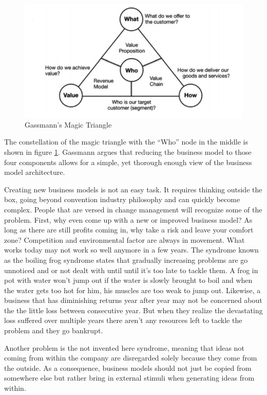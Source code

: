 		\begin{figure}[ht]
		    \begin{center}
		    \includegraphics[scale=0.6]{Talk11/Figure1.png}
		    \end{center}
		    \caption{Gassmann's Magic Triangle}
		    \label{fig:m_triangle}
		\end{figure}
		The constellation of the magic triangle with the ``Who'' node in the middle is shown in figure \ref{fig:m_triangle}.
		Gassmann argues that reducing the business model to those four components allows for a simple, yet thorough enough view of the business model architecture.

		Creating new business models is not an easy task. It requires thinking outside the box, going beyond convention industry philosophy and can quickly become complex. People that are versed in change management will recognize some of the problem. First, why even come up with a new or improved business model? As long as there are still profits coming in, why take a risk and leave your comfort zone? Competition and environmental factor are always in movement. What works today may not work so well anymore in a few years. The syndrome known as the boiling frog syndrome states that gradually increasing problems are go unnoticed and or not dealt with until until it's too late to tackle them. A frog in pot with water won't jump out if the water is slowly brought to boil and when the water gets too hot for him, his muscles are too weak to jump out. Likewise, a business that has diminishing returns year after year may not be concerned about the the little loss between consecutive year. But when they realize the devastating loss suffered over multiple years there aren't any resources left to tackle the problem and they go bankrupt.

		Another problem is the not invented here syndrome, meaning that ideas not coming from within the company are disregarded solely because they come from the outside. As a consequence, business models should not just be copied from somewhere else but rather bring in external stimuli when generating ideas from within.

